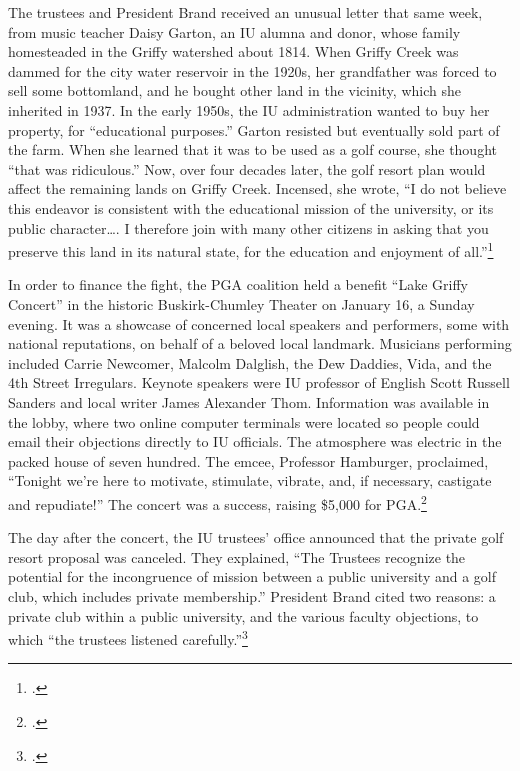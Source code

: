\documentclass[
  american,
  letterpaper,
]{scrreprt}
\begin{document}
The trustees and President Brand received an unusual letter that same
week, from music teacher Daisy Garton, an IU alumna and donor, whose
family homesteaded in the Griffy watershed about 1814. When Griffy Creek
was dammed for the city water reservoir in the 1920s, her grandfather
was forced to sell some bottomland, and he bought other land in the
vicinity, which she inherited in 1937. In the early 1950s, the IU
administration wanted to buy her property, for ``educational purposes.''
Garton resisted but eventually sold part of the farm. When she learned
that it was to be used as a golf course, she thought ``that was
ridiculous.'' Now, over four decades later, the golf resort plan would
affect the remaining lands on Griffy Creek. Incensed, she wrote, ``I do
not believe this endeavor is consistent with the educational mission of
the university, or its public character\ldots. I therefore join with
many other citizens in asking that you preserve this land in its natural
state, for the education and enjoyment of all.''\footnote{.}

In order to finance the fight, the PGA coalition held a benefit ``Lake
Griffy Concert'' in the historic Buskirk-Chumley Theater on January 16,
a Sunday evening. It was a showcase of concerned local speakers and
performers, some with national reputations, on behalf of a beloved local
landmark. Musicians performing included Carrie Newcomer, Malcolm
Dalglish, the Dew Daddies, Vida, and the 4th Street Irregulars. Keynote
speakers were IU professor of English Scott Russell Sanders and local
writer James Alexander Thom. Information was available in the lobby,
where two online computer terminals were located so people could email
their objections directly to IU officials. The atmosphere was electric
in the packed house of seven hundred. The emcee, Professor Hamburger,
proclaimed, ``Tonight we're here to motivate, stimulate, vibrate, and,
if necessary, castigate and repudiate!'' The concert was a success,
raising \$5,000 for PGA.\footnote{.}

The day after the concert, the IU trustees' office announced that the
private golf resort proposal was canceled. They explained, ``The
Trustees recognize the potential for the incongruence of mission between
a public university and a golf club, which includes private
membership.'' President Brand cited two reasons: a private club within a
public university, and the various faculty objections, to which ``the
trustees listened carefully.''\footnote{.}
\end{document}
